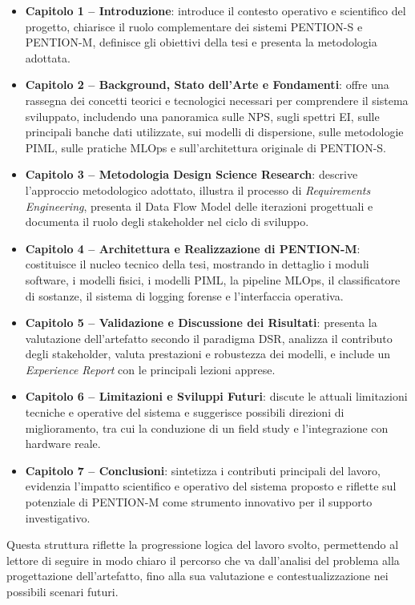 \begin{itemize}
	\item \textbf{Capitolo 1 -- Introduzione}: introduce il contesto operativo e scientifico del progetto, chiarisce il ruolo complementare dei sistemi \textsc{PENTION-S} e \textsc{PENTION-M}, definisce gli obiettivi della tesi e presenta la metodologia adottata.
	\item \textbf{Capitolo 2 -- Background, Stato dell’Arte e Fondamenti}: offre una rassegna dei concetti teorici e tecnologici necessari per comprendere il sistema sviluppato, includendo una panoramica sulle NPS, sugli spettri EI, sulle principali banche dati utilizzate, sui modelli di dispersione, sulle metodologie PIML, sulle pratiche MLOps e sull’architettura originale di \textsc{PENTION-S}.
	\item \textbf{Capitolo 3 -- Metodologia Design Science Research}: descrive l’approccio metodologico adottato, illustra il processo di \textit{Requirements Engineering}, presenta il Data Flow Model delle iterazioni progettuali e documenta il ruolo degli stakeholder nel ciclo di sviluppo.
	\item \textbf{Capitolo 4 -- Architettura e Realizzazione di \textsc{PENTION-M}}: costituisce il nucleo tecnico della tesi, mostrando in dettaglio i moduli software, i modelli fisici, i modelli PIML, la pipeline MLOps, il classificatore di sostanze, il sistema di logging forense e l’interfaccia operativa.
	\item \textbf{Capitolo 5 -- Validazione e Discussione dei Risultati}: presenta la valutazione dell’artefatto secondo il paradigma DSR, analizza il contributo degli stakeholder, valuta prestazioni e robustezza dei modelli, e include un \textit{Experience Report} con le principali lezioni apprese.
	\item \textbf{Capitolo 6 -- Limitazioni e Sviluppi Futuri}: discute le attuali limitazioni tecniche e operative del sistema e suggerisce possibili direzioni di miglioramento, tra cui la conduzione di un field study e l’integrazione con hardware reale.
	\item \textbf{Capitolo 7 -- Conclusioni}: sintetizza i contributi principali del lavoro, evidenzia l’impatto scientifico e operativo del sistema proposto e riflette sul potenziale di \textsc{PENTION-M} come strumento innovativo per il supporto investigativo.
\end{itemize}

Questa struttura riflette la progressione logica del lavoro svolto, permettendo al lettore di seguire in modo chiaro il percorso che va dall’analisi del problema alla progettazione dell’artefatto, fino alla sua valutazione e contestualizzazione nei possibili scenari futuri.